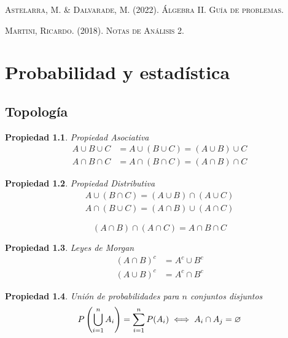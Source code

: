 \documentclass[a5paper,12pt,twoside]{book}
\newtheorem{prop}{{Propiedad}}[chapter]
\begin{document}
\begin{thebibliography}{2}
     \textsc{Astelarra, M. \& Dalvarade, M. (2022). Álgebra II. Guía de problemas.}
    
     \textsc{Martini, Ricardo. (2018). Notas de Análisis 2.}
\end{thebibliography}


\chapter{Probabilidad y estadística}


\section{Topología}

\begin{prop}
Propiedad Asociativa
\begin{equation}
\begin{split}
A \cup B \cup C &= A \cup (B \cup C) = (A \cup B) \cup C
\\
A \cap B \cap C &= A \cap (B \cap C) = (A \cap B) \cap C
\end{split}
\end{equation}
\end{prop}

\begin{prop}
Propiedad Distributiva
\begin{equation}
\begin{split}
A \cup (B \cap C) = (A \cup B) \cap (A \cup C)
\\
A \cap (B \cup C) = (A \cap B) \cup (A \cap C)
\end{split}
\end{equation}
\end{prop}

\begin{equation}
(A \cap B) \cap (A \cap C) = A \cap B \cap C
\end{equation}

\begin{prop}
Leyes de Morgan
\begin{equation}
\begin{split}
(A \cap B)^c &= A^c \cup B^c
\\
(A \cup B)^c &= A^c \cap B^c
\end{split}
\end{equation}
\end{prop}

\begin{prop}
Unión de probabilidades para $n$ conjuntos disjuntos
\begin{equation}
P \left( \bigcup_{i=1}^n A_i \right) = \sum_{i=1}^n P(A_i) \iff A_i \cap A_j = \varnothing
\end{equation}
\end{prop}
\end{document}

